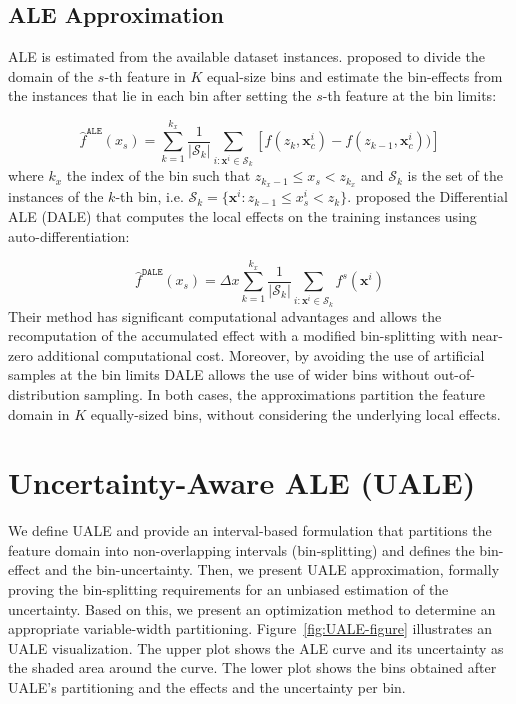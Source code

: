 \documentclass[twoside]{article}
\newcommand{\xc}{\mathbf{x}_c}
\newcommand{\xb}{\mathbf{x}}
\begin{document}
\subsection{ALE Approximation}
\label{sec:ale-approximation}

ALE is estimated from the available dataset instances. \citep{apley2020visualizing} proposed to divide the domain of the \(s\)-th feature in \(K\) equal-size bins and estimate the bin-effects from the instances that lie in each bin after setting the \(s\)-th feature at the bin limits:

\begin{equation}
  \label{eq:ALE_accumulated_mean_est}
  \hat{f}^{\mathtt{ALE}}(x_s) = \sum_{k=1}^{k_x} \frac{1}{|\mathcal{S}_k|} \sum_{i:\mathbf{x}^i \in
    \mathcal{S}_k} \left [ f(z_{k}, \xc^i) - f(z_{k-1}, \xc^i)) \right ]
\end{equation}
%
where \(k_x\) the index of the bin such that \(z_{k_x-1} \leq x_s < z_{k_x} \) and \(\mathcal{S}_k\) is the set of the instances of the \(k\)-th bin, i.e.  \( \mathcal{S}_k = \{ \xb^i : z_{k-1} \leq x^i_s < z_{k} \} \). \citep{gkolemis22} proposed the Differential ALE (DALE) that computes the local effects on the training instances using auto-differentiation:

\begin{equation}  \label{eq:DALE_accumulated_mean_est}
  \hat{f}^{\mathtt{DALE}}(x_s) = \Delta x \sum_{k=1}^{k_x} \frac{1}{|\mathcal{S}_k|} \sum_{i:\mathbf{x}^i \in
    \mathcal{S}_k} f^s(\mathbf{x}^i)
\end{equation}
%
Their method has significant computational advantages and allows the recomputation of the accumulated effect with a modified bin-splitting with near-zero additional computational cost. Moreover, by avoiding the use of artificial samples at the bin limits DALE allows the use of wider bins without out-of-distribution sampling. In both cases, the approximations partition the feature domain in \(K\) equally-sized bins, without considering the underlying local effects.

\section{Uncertainty-Aware ALE (UALE)}
\label{sec:UALE}

We define UALE and provide an interval-based formulation that partitions the feature domain into non-overlapping intervals (bin-splitting) and defines the bin-effect and the bin-uncertainty. Then, we present UALE approximation, formally proving the bin-splitting requirements for an unbiased estimation of the uncertainty. Based on this, we present an optimization method to determine an appropriate variable-width partitioning. Figure~\ref{fig:UALE-figure} illustrates an UALE visualization. The upper plot shows the ALE curve and its uncertainty as the shaded area around the curve. The lower plot shows the bins obtained after UALE's partitioning and the effects and the uncertainty per bin.
\end{document}
